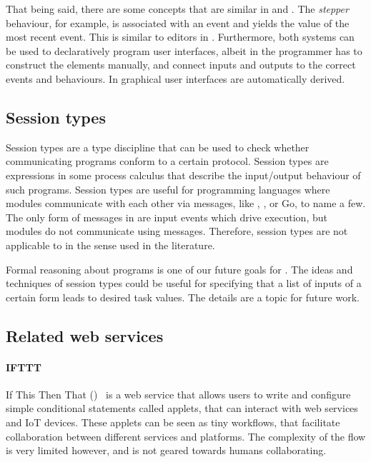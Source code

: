 That being said, there are some concepts that are similar in \TOP and \FRP.
The \emph{stepper} behaviour, for example, is associated with an event and yields the value of the most recent event.
This is similar to editors in \TOP.
Furthermore, both systems can be used to declaratively program user interfaces, albeit in \FRP the programmer has to construct the \GUI elements manually, and connect inputs and outputs to the correct events and behaviours.
In \TOP graphical user interfaces are automatically derived.



\subsection{Session types}

Session types are a type discipline that can be used to check whether communicating programs conform to a certain protocol.
Session types are expressions in some process calculus that describe the input/output behaviour of such programs.
Session types are useful for programming languages where modules communicate with each other via messages, like \CSP, \PICALC, or Go, to name a few.
The only form of messages in \TOP are input events which drive execution, but modules do not communicate using messages.
Therefore, session types are not applicable to \TOP in the sense used in the literature.

Formal reasoning about \TOP programs is one of our future goals for \TOPHAT.
The ideas and techniques of session types could be useful for specifying that a list of inputs of a certain form leads to desired task values.
The details are a topic for future work.



\subsection{Related web services}


\paragraph{IFTTT}

If This Then That (\IFTTT)~\cite{IFTTT} is a web service that allows users to write and
configure simple conditional statements called applets, that can interact with
web services and IoT devices. These applets can be seen as tiny workflows, that
facilitate collaboration between different services and platforms. The
complexity of the flow is very limited however, and is not geared towards humans
collaborating.

